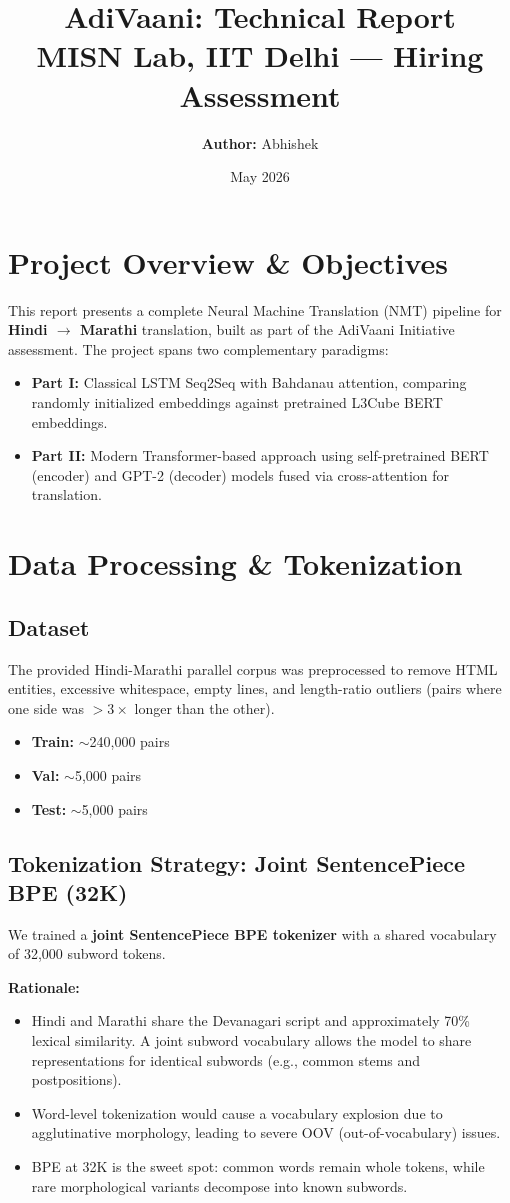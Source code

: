 \documentclass[11pt, a4paper]{article}
\title{\textbf{AdiVaani: Technical Report} \\ \Large MISN Lab, IIT Delhi --- Hiring Assessment}
\author{\textbf{Author:} Abhishek}
\date{May 2026}
\begin{document}
\maketitle

\section{Project Overview \& Objectives}
This report presents a complete Neural Machine Translation (NMT) pipeline for \textbf{Hindi $\rightarrow$ Marathi} translation, built as part of the AdiVaani Initiative assessment. The project spans two complementary paradigms:
\begin{itemize}
    \item \textbf{Part I:} Classical LSTM Seq2Seq with Bahdanau attention, comparing randomly initialized embeddings against pretrained L3Cube BERT embeddings.
    \item \textbf{Part II:} Modern Transformer-based approach using self-pretrained BERT (encoder) and GPT-2 (decoder) models fused via cross-attention for translation.
\end{itemize}

\section{Data Processing \& Tokenization}
\subsection{Dataset}
The provided Hindi-Marathi parallel corpus was preprocessed to remove HTML entities, excessive whitespace, empty lines, and length-ratio outliers (pairs where one side was $>3\times$ longer than the other).
\begin{itemize}
    \item \textbf{Train:} $\sim$240,000 pairs
    \item \textbf{Val:} $\sim$5,000 pairs
    \item \textbf{Test:} $\sim$5,000 pairs
\end{itemize}

\subsection{Tokenization Strategy: Joint SentencePiece BPE (32K)}
We trained a \textbf{joint SentencePiece BPE tokenizer} with a shared vocabulary of 32,000 subword tokens.

\textbf{Rationale:}
\begin{itemize}
    \item Hindi and Marathi share the Devanagari script and approximately 70\% lexical similarity. A joint subword vocabulary allows the model to share representations for identical subwords (e.g., common stems and postpositions).
    \item Word-level tokenization would cause a vocabulary explosion due to agglutinative morphology, leading to severe OOV (out-of-vocabulary) issues.
    \item BPE at 32K is the sweet spot: common words remain whole tokens, while rare morphological variants decompose into known subwords.
\end{itemize}
\end{document}
